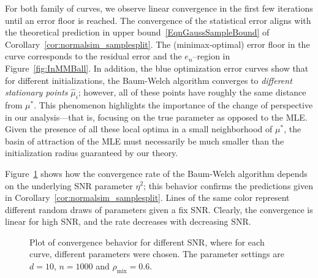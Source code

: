 \documentclass[twoside,11pt]{article}
\newcommand{\numobs}{\ensuremath{n}}
\newcommand{\widgraph}[2]{\texttt{[image: \#2]}}
\newcommand{\mixcoef}{\ensuremath{\rho_{\mathrm{mix}}}}
\newcommand{\paramobs}{\mu}
\newcommand{\trueparamobs}{\ensuremath{\paramobs^*}}
\newcommand{\SNR}{\eta^2}
\newcommand{\paramobshat}{\widehat{\paramobs}}
\newcommand{\minimaxrad}{\ensuremath{e_\numobs}}
\begin{document}
For both family of curves, we observe linear convergence in the first
few iterations until an error floor is reached.  The convergence of
the statistical error aligns with the theoretical prediction in upper
bound~\eqref{EqnGaussSampleBound} of
Corollary~\ref{cor:normalsim_samplesplit}. The (minimax-optimal) error
floor in the curve corresponds to the residual error and the
$\minimaxrad$--region in Figure~\ref{fig:InMMBall}.  In addition, the
blue optimization error curves show that for different
initializations, the Baum-Welch algorithm converges to \emph{different
  stationary points} $\paramobshat_i$; however, all of these points
have roughly the same distance from $\trueparamobs$.  This phenomenon
highlights the importance of the change of perspective in our
analysis---that is, focusing on the true parameter as opposed to the
MLE.  Given the presence of all these local optima in a small
neighborhood of $\trueparamobs$, the basin of attraction of the MLE must
necessarily be much smaller than the initialization radius guaranteed
by our theory.


Figure~\ref{fig:muerror_snr} shows how the convergence rate of the
Baum-Welch algorithm depends on the underlying SNR parameter $\SNR$;
this behavior confirms the predictions given in
Corollary~\ref{cor:normalsim_samplesplit}.  Lines of the same color
represent different random draws of parameters given a fix
SNR. Clearly, the convergence is linear for high SNR, and the rate
decreases with decreasing SNR.  

\begin{figure}[htbp]
\begin{center}
\subfigure{
  \widgraph{0.45\textwidth}{images/Obserr_iteration_SNR_nopca.pdf} }
\end{center}
\caption{Plot of convergence behavior for different SNR, where for
  each curve, different parameters were chosen.  The parameter
  settings are $d=10$, $n=1000$ and $\mixcoef = 0.6$.  }
\label{fig:muerror_snr}
\end{figure}



\end{document}
